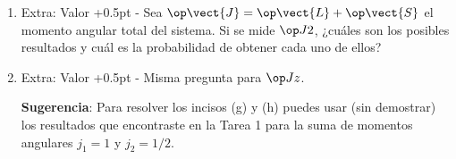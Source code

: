 \documentclass[./../main.tex]{subfiles}
\begin{document}
\begin{exercise}
\begin{enumerate}
            \color{blue}
            \item Extra: Valor +0.5pt - Sea \(\observable{\vect{J}} = \observable{\vect{L}} + \observable{\vect{S}}\) el momento angular total del sistema. Si se mide \(\observable{J}[][2]\), ¿cuáles son los posibles resultados y cuál es la probabilidad de obtener cada uno de ellos?
            \item Extra: Valor +0.5pt - Misma pregunta para \(\observable{J}[z]\).
            
            \textbf{Sugerencia}: Para resolver los incisos (g) y (h) puedes usar (sin demostrar) los resultados que encontraste en la Tarea 1 para la suma de momentos angulares \(j_{1} = 1\) y \(j_{2} = 1/2\). 
        \end{enumerate}
    \end{exercise}
\end{document}
